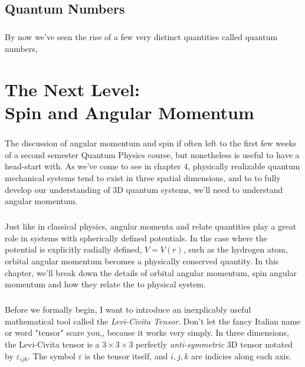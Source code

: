 \documentclass[12pt,letterpaper]{book}
\begin{document}


\section{Quantum Numbers}

\paragraph*{}By now we've seen the rise of a few very distinct quantities called quantum numbers,







\chapter{The Next Level: \\ Spin and Angular Momentum}

\paragraph*{}The discussion of angular momentum and spin if often left to the first few weeks of a second semester Quantum Physics course, but nonetheless is useful to have a head-start with. As we've come to see in chapter 4, physically realizable quantum mechanical systems tend to exist in three spatial dimensions, and to to fully develop our understanding of 3D quantum systems, we'll need to understand angular momentum. 

\paragraph*{}Just like in classical physics, angular momenta and relate quantities play a great role in systems with spherically defined potentials. In the case where the potential is explicitly radially defined, $V = V(r)$, such as the hydrogen atom, orbital angular momentum becomes a physically conserved quantity. In this chapter, we'll break down the details of orbital angular momentum, spin angular momentum and how they relate the to physical system.

\paragraph*{}Before we formally begin, I want to introduce an inexplicably useful mathematical tool called the \textit{Levi-Civita Tensor}. Don't let the fancy Italian name or word "tensor" scare you,, because it works very simply. In three dimensions, the Levi-Civita tensor is a $3 \times 3 \times 3$ perfectly \textit{anti-symmetric} 3D tensor notated by $\varepsilon_{ijk}$. The symbol $\varepsilon$ is the tensor itself, and $i,j,k$ are indicies along each axis.
\end{document}
